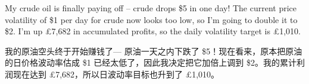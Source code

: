 
\begin{englishblock} My crude oil is finally paying off -- crude drops \$5 in one day! The current price volatility of \$1 per day for crude now looks too low, so I'm going to double it to \$2. I'm up £7,682 in accumulated profits, so the daily volatility target is £1,010. \end{englishblock}

\begin{chineseblock}我的原油空头终于开始赚钱了--- 原油一天之内下跌了 \$5！现在看来，原本把原油的日价格波动率估成 \$1 已经太低了，因此我决定把它加倍上调到 \$2。我的累计利润现在达到 £7,682，所以日波动率目标也升到了 £1,010。 \end{chineseblock}

